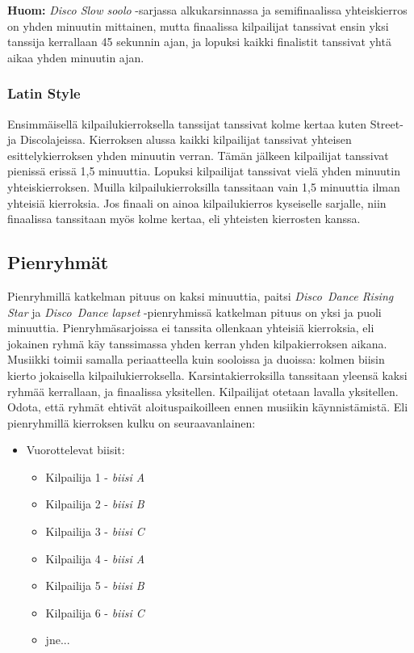 \documentclass[12pt, a4paper, oneside]{article}
\begin{document}
\textbf{Huom:} \textit{Disco Slow soolo} -sarjassa alkukarsinnassa ja semifinaalissa yhteiskierros on yhden minuutin mittainen,
mutta finaalissa kilpailijat tanssivat ensin yksi tanssija kerrallaan 45 sekunnin ajan,
ja lopuksi kaikki finalistit tanssivat yhtä aikaa yhden minuutin ajan.

\subsubsection{Latin Style}

Ensimmäisellä kilpailukierroksella tanssijat tanssivat kolme kertaa kuten Street- ja Discolajeissa.
Kierroksen alussa kaikki kilpailijat tanssivat yhteisen esittelykierroksen yhden minuutin verran.
Tämän jälkeen kilpailijat tanssivat pienissä erissä 1,5 minuuttia.
Lopuksi kilpailijat tanssivat vielä yhden minuutin yhteiskierroksen.
Muilla kilpailukierroksilla tanssitaan vain 1,5 minuuttia ilman yhteisiä kierroksia.
Jos finaali on ainoa kilpailukierros kyseiselle sarjalle,
niin finaalissa tanssitaan myös kolme kertaa,
eli yhteisten kierrosten kanssa.

\subsection{Pienryhmät}

Pienryhmillä katkelman pituus on kaksi minuuttia,
paitsi \textit{Disco~Dance Rising Star} ja \textit{Disco~Dance lapset} -pienryhmissä katkelman pituus on yksi ja puoli minuuttia.
Pienryhmäsarjoissa ei tanssita ollenkaan yhteisiä kierroksia,
eli jokainen ryhmä käy tanssimassa yhden kerran yhden kilpakierroksen aikana.
Musiikki toimii samalla periaatteella kuin sooloissa ja duoissa: kolmen biisin kierto jokaisella kilpailukierroksella.
Karsintakierroksilla tanssitaan yleensä kaksi ryhmää kerrallaan,
ja finaalissa yksitellen.
Kilpailijat otetaan lavalla yksitellen.
Odota, että ryhmät ehtivät aloituspaikoilleen ennen musiikin käynnistämistä.
Eli pienryhmillä kierroksen kulku on seuraavanlainen:

\begin{itemize}[nosep]
    \item Vuorottelevat biisit:
          \begin{itemize}
              \item Kilpailija 1 - \textit{biisi A}
              \item Kilpailija 2 - \textit{biisi B}
              \item Kilpailija 3 - \textit{biisi C}
              \item Kilpailija 4 - \textit{biisi A}
              \item Kilpailija 5 - \textit{biisi B}
              \item Kilpailija 6 - \textit{biisi C}
              \item jne...
          \end{itemize}
\end{itemize}
\end{document}
